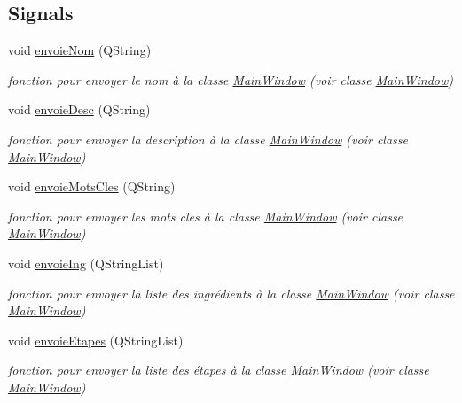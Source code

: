 \subsection*{Signals}
\begin{DoxyCompactItemize}
\item 
void \hyperlink{classRecette_aaf3e04383c78a2cef6af41eac226f07d}{envoie\+Nom} (Q\+String)
\begin{DoxyCompactList}\small\item\em fonction pour envoyer le nom à la classe \hyperlink{classMainWindow}{Main\+Window} (voir classe \hyperlink{classMainWindow}{Main\+Window}) \end{DoxyCompactList}\item 
void \hyperlink{classRecette_a4871cd68f067b53e882eb2389c11c763}{envoie\+Desc} (Q\+String)
\begin{DoxyCompactList}\small\item\em fonction pour envoyer la description à la classe \hyperlink{classMainWindow}{Main\+Window} (voir classe \hyperlink{classMainWindow}{Main\+Window}) \end{DoxyCompactList}\item 
void \hyperlink{classRecette_a06b677268e4a76357a008460bf78bf57}{envoie\+Mots\+Cles} (Q\+String)
\begin{DoxyCompactList}\small\item\em fonction pour envoyer les mots cles à la classe \hyperlink{classMainWindow}{Main\+Window} (voir classe \hyperlink{classMainWindow}{Main\+Window}) \end{DoxyCompactList}\item 
void \hyperlink{classRecette_a02f5f61d8c8a59b482f81da7450aa133}{envoie\+Ing} (Q\+String\+List)
\begin{DoxyCompactList}\small\item\em fonction pour envoyer la liste des ingrédients à la classe \hyperlink{classMainWindow}{Main\+Window} (voir classe \hyperlink{classMainWindow}{Main\+Window}) \end{DoxyCompactList}\item 
void \hyperlink{classRecette_ab8af419707ae263fb7b273988b81bd6e}{envoie\+Etapes} (Q\+String\+List)
\begin{DoxyCompactList}\small\item\em fonction pour envoyer la liste des étapes à la classe \hyperlink{classMainWindow}{Main\+Window} (voir classe \hyperlink{classMainWindow}{Main\+Window}) \end{DoxyCompactList}\item 

\end{DoxyCompactItemize}
